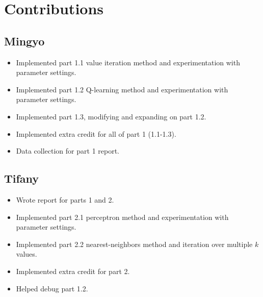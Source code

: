 \section{Contributions}
\subsection{Mingyo}
\begin{itemize}
  \item Implemented part 1.1 value iteration method and experimentation with parameter settings.
  \item Implemented part 1.2 Q-learning method and experimentation with parameter settings.
  \item Implemented part 1.3, modifying and expanding on part 1.2.
  \item Implemented extra credit for all of part 1 (1.1-1.3).
  \item Data collection for part 1 report.
\end{itemize}
\subsection{Tifany}
\begin{itemize}
  \item Wrote report for parts 1 and 2.
  \item Implemented part 2.1 perceptron method and experimentation with parameter settings.
  \item Implemented part 2.2 nearest-neighbors method and iteration over multiple $k$ values.
  \item Implemented extra credit for part 2.
  \item Helped debug part 1.2.
\end{itemize}